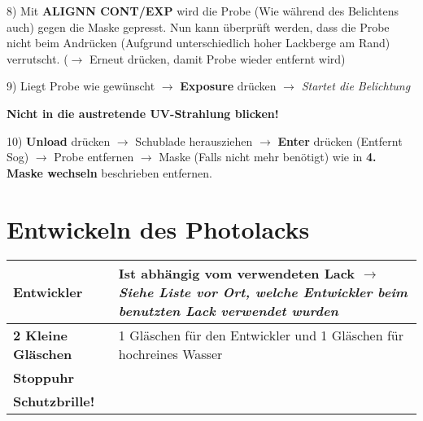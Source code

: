 \documentclass[12pt,a4paper]{article}
\begin{document}
\begin{description}
\item 8) Mit \textbf{ALIGNN CONT/EXP} wird die Probe (Wie während des Belichtens auch) gegen die Maske gepresst. Nun kann überprüft werden, dass die Probe nicht beim Andrücken (Aufgrund unterschiedlich hoher Lackberge am Rand) verrutscht. ($\rightarrow$ Erneut drücken, damit Probe wieder entfernt wird)

\item 9) Liegt Probe wie gewünscht $\rightarrow$ \textbf{Exposure} drücken $\rightarrow$ \textit{Startet die Belichtung}
\begin{center}
\textbf{Nicht in die austretende UV-Strahlung blicken!}
\end{center}

\item 10) \textbf{Unload} drücken $\rightarrow$ Schublade herausziehen $\rightarrow$ \textbf{Enter} drücken (Entfernt Sog) $\rightarrow$ Probe entfernen $\rightarrow$ Maske (Falls nicht mehr benötigt) wie in \textbf{4. Maske wechseln} beschrieben entfernen.

\end{description}


\section{Entwickeln des Photolacks}

\begin{tabular}{| p{5cm} | p{10cm} |} \hline
\textbf{Entwickler} & Ist abhängig vom verwendeten Lack\newline
$\rightarrow$ \textit{Siehe Liste vor Ort, welche Entwickler beim benutzten Lack verwendet wurden}\\ \hline
\textbf{2 Kleine Gläschen} & 1 Gläschen für den Entwickler und 1 Gläschen für hochreines Wasser\\ \hline
\textbf{Stoppuhr} & \\
\textbf{Schutzbrille!} & \\ \hline
\end{tabular}
\end{document}
